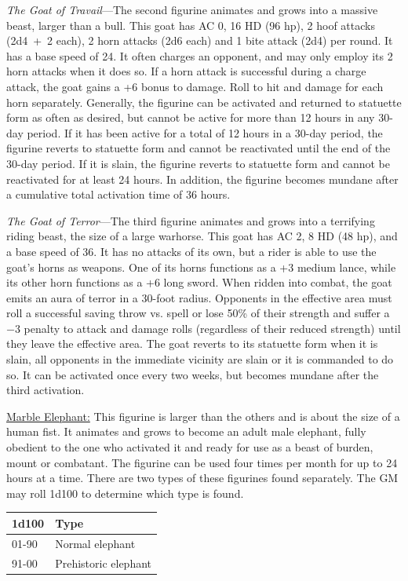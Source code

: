\begin{multicols}{2}
\textit{The Goat of Travail}---The second figurine animates and grows into a massive beast, larger than a bull.  This goat has AC 0, 16 HD (96 hp), 2 hoof attacks (2d4~+~2 each), 2 horn attacks (2d6 each) and 1 bite attack (2d4) per round.  It has a base speed of 24.  It often charges an opponent, and may only employ its 2 horn attacks when it does so.  If a horn attack is successful during a charge attack, the goat gains a +6 bonus to damage.  Roll to hit and damage for each horn separately.  Generally, the figurine can be activated and returned to statuette form as often as desired, but cannot be active for more than 12 hours in any 30-day period.  If it has been active for a total of 12 hours in a 30-day period, the figurine reverts to statuette form and cannot be reactivated until the end of the 30-day period.  If it is slain, the figurine reverts to statuette form and cannot be reactivated for at least 24 hours.  In addition, the figurine becomes mundane after a cumulative total activation time of 36 hours.  

\textit{The Goat of Terror}---The third figurine animates and grows into a terrifying riding beast, the size of a large warhorse.  This goat has AC 2, 8 HD (48 hp), and a base speed of 36.  It has no attacks of its own, but a rider is able to use the goat's horns as weapons.  One of its horns functions as a +3 medium lance, while its other horn functions as a +6 long sword.  When ridden into combat, the goat emits an aura of terror in a 30-foot radius.  Opponents in the effective area must roll a successful saving throw vs. spell or lose 50\% of their strength and suffer a $-3$ penalty to attack and damage rolls (regardless of their reduced strength) until they leave the effective area.  The goat reverts to its statuette form when it is slain, all opponents in the immediate vicinity are slain or it is commanded to do so.  It can be activated once every two weeks, but becomes mundane after the third activation.

\underline{Marble Elephant:} This figurine is larger than the others and is about the size of a human fist.  It animates and grows to become an adult male elephant, fully obedient to the one who activated it and ready for use as a beast of burden, mount or combatant.  The figurine can be used four times per month for up to 24 hours at a time.  There are two types of these figurines found separately.  The GM may roll 1d100 to determine which type is found.

\noindent \begin{tabular}{|p{}|p{}|}
\hline
1d100	& Type \\
\hline\hline
\rowcolor[gray]{.9}01-90	& Normal elephant \\
91-00	& Prehistoric elephant \\
\hline
\end{tabular}


\end{multicols}
